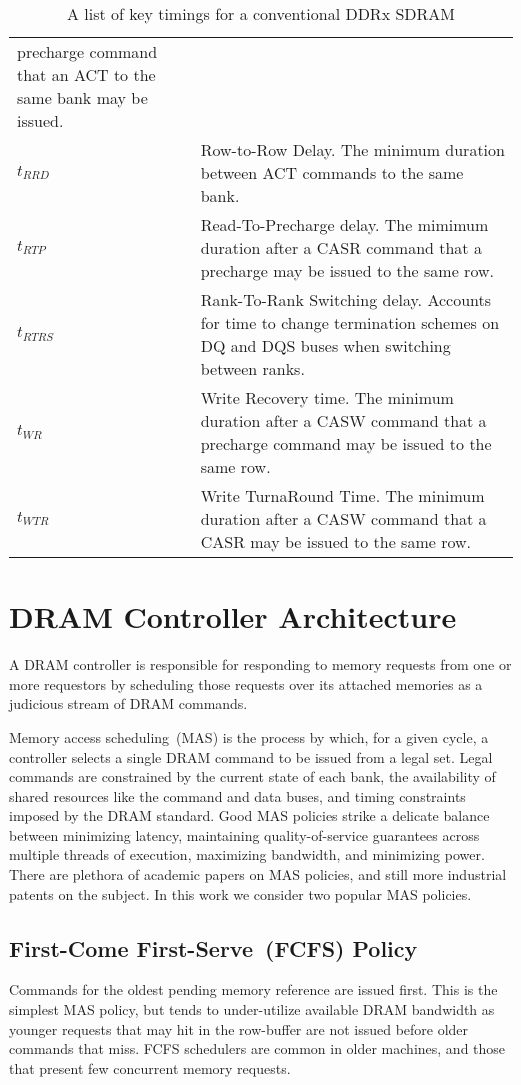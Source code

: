 \begin{table}[htb]
\begin{center}
{\begin{tabular}{|p{}|p{}|}
    precharge command that an ACT to the same bank may be issued. \\
    \textbf{$t_{RRD}$} & Row-to-Row Delay. The minimum duration between ACT commands to the same bank. \\
    \textbf{$t_{RTP}$} & Read-To-Precharge delay. The mimimum duration after a CASR command that a precharge may be issued to the same row. \\
    \textbf{$t_{RTRS}$} & Rank-To-Rank Switching delay. Accounts for time to change termination schemes on DQ and DQS buses when switching between ranks. \\
    \textbf{$t_{WR}$} & Write Recovery time. The minimum duration after a CASW command that a precharge command may be issued to the same row. \\
    \textbf{$t_{WTR}$} & Write TurnaRound Time. The minimum duration after a CASW command that a CASR may be issued to the same row. \\
    \hline
\end{tabular}}
\end{center}
\caption{A list of key timings for a conventional DDRx SDRAM}
\label{tbl:dram-timings}
\end{table}%

\clearpage
\section{DRAM Controller Architecture}

A DRAM controller is responsible for responding to memory
requests from one or more requestors by scheduling those requests over its
attached memories as a judicious stream of DRAM commands.

Memory access scheduling~(MAS) is the process by which, for a given cycle, a
controller selects a single DRAM command to be issued from a legal set. Legal
commands are constrained by the current state of each bank, the availability
of shared resources like the command and data buses, and timing constraints
imposed by the DRAM standard. Good MAS policies strike a delicate balance
between minimizing latency, maintaining quality-of-service guarantees across
multiple threads of execution, maximizing bandwidth, and minimizing power.
There are plethora of academic papers on MAS policies, and still more
industrial patents on the subject. In this work we consider two popular MAS policies. 

\subsection{First-Come First-Serve~(FCFS) Policy}\label{sec:fcfs} Commands for the
oldest pending memory reference are issued first. This is the simplest MAS
policy, but tends to under-utilize available DRAM bandwidth as younger requests
that may hit in the row-buffer are not issued before older commands that miss.
FCFS schedulers are common in older machines, and those that present few
concurrent memory requests.

